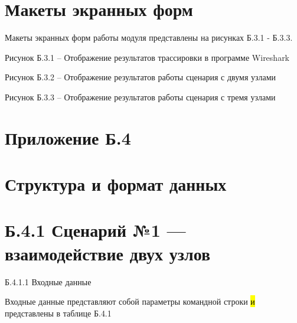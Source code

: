 \section{}\label{section-2}

\section{Макеты экранных
форм}\label{ux43cux430ux43aux435ux442ux44b-ux44dux43aux440ux430ux43dux43dux44bux445-ux444ux43eux440ux43c}

Макеты экранных форм работы модуля представлены на рисунках Б.3.1 -
Б.3.3.

Рисунок Б.3.1 -- Отображение результатов трассировки в программе
Wireshark

Рисунок Б.3.2 -- Отображение результатов работы сценария с двумя
узлами\hl{}

\hl{}

\hl{}

Рисунок Б.3.3 -- Отображение результатов работы сценария с тремя
узлами\hl{}

\section{Приложение
Б.4}\label{ux43fux440ux438ux43bux43eux436ux435ux43dux438ux435-ux431.4}

\section{}\label{section-3}

\section{Структура и формат
данных}\label{ux441ux442ux440ux443ux43aux442ux443ux440ux430-ux438-ux444ux43eux440ux43cux430ux442-ux434ux430ux43dux43dux44bux445}

\hl{}

\section{Б.4.1 Сценарий №1 --- взаимодействие двух
узлов}\label{ux431.4.1-ux441ux446ux435ux43dux430ux440ux438ux439-1-ux432ux437ux430ux438ux43cux43eux434ux435ux439ux441ux442ux432ux438ux435-ux434ux432ux443ux445-ux443ux437ux43bux43eux432}

Б.4.1.1 Входные данные\hl{}

Входные данные представляют собой параметры командной строки \hl{и}
представлены в таблице Б.4.1\hl{}

